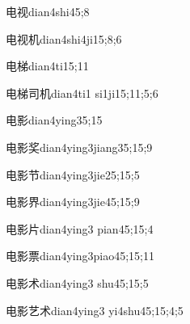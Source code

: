 \begin{verbete}{电视}{dian4shi4}{5;8}
\end{verbete}

\begin{verbete}{电视机}{dian4shi4ji1}{5;8;6}
\end{verbete}

\begin{verbete}{电梯}{dian4ti1}{5;11}
\end{verbete}

\begin{verbete}{电梯司机}{dian4ti1 si1ji1}{5;11;5;6}
\end{verbete}

\begin{verbete}{电影}{dian4ying3}{5;15}
\end{verbete}

\begin{verbete}{电影奖}{dian4ying3jiang3}{5;15;9}
\end{verbete}

\begin{verbete}{电影节}{dian4ying3jie2}{5;15;5}
\end{verbete}

\begin{verbete}{电影界}{dian4ying3jie4}{5;15;9}
\end{verbete}

\begin{verbete}{电影片}{dian4ying3 pian4}{5;15;4}
\end{verbete}

\begin{verbete}{电影票}{dian4ying3piao4}{5;15;11}
\end{verbete}

\begin{verbete}{电影术}{dian4ying3 shu4}{5;15;5}
\end{verbete}

\begin{verbete}{电影艺术}{dian4ying3 yi4shu4}{5;15;4;5}
\end{verbete}

